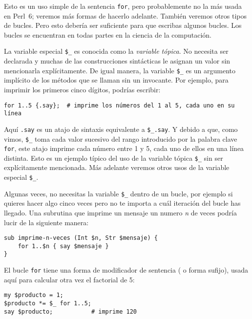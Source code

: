Esto es un uso simple de la sentencia {\tt for},
pero probablemente no la más usada en Perl~6; veremos
más formas de hacerlo adelante. También veremos otros 
tipos de bucles. Pero esto debería ser suficiente para que 
escribas algunos bucles. Los bucles se encuentran en todas
partes en la ciencia de la computación.

La variable especial \verb|$_| es conocida como la 
\emph{variable tópica}. No necesita ser declarada y 
muchas de las construcciones sintácticas le asignan un valor
sin mencionarla explícitamente. De igual manera,
la variable \verb|$_| es un argumento implícito de los
métodos que se llaman sin un invocante. Por ejemplo,
para imprimir los primeros cinco dígitos, podrías
escribir:

\begin{verbatim}
for 1..5 {.say};  # imprime los números del 1 al 5, cada uno en su línea
\end{verbatim} 

Aquí {\tt .say} es un atajo de sintaxis equivalente a \verb|$_.say|.
Y debido a que, como vimos, \verb|$_| toma cada valor sucesivo del 
rango introducido por la palabra clave {\tt for}, este atajo imprime
cada número entre 1 y 5, cada uno de ellos en una línea distinta.
Esto es un ejemplo típico del uso de la variable tópica \verb|$_|
sin ser explícitamente mencionada. Más adelante veremos otros
usos de la variable especial \verb|$_|. 

Algunas veces, no necesitas la variable \verb|$_| dentro de un bucle,
por ejemplo si quieres hacer algo cinco veces pero no te importa a cuál
iteración del bucle has llegado. Una subrutina que imprime un mensaje 
un numero \emph{n} de veces podría lucir de la siguiente manera:

\begin{verbatim}
sub imprime-n-veces (Int $n, Str $mensaje) {
    for 1..$n { say $mensaje }
} 
\end{verbatim} 

El bucle {\tt for} tiene una forma de modificador de sentencia (
o forma sufijo), usada aquí para calcular otra vez el factorial de 5:

\begin{verbatim}
my $producto = 1;
$producto *= $_ for 1..5;
say $producto;           # imprime 120
\end{verbatim} 


